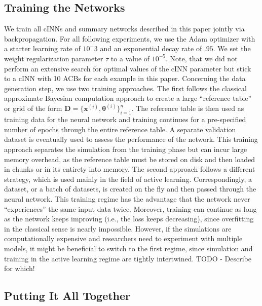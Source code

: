 \documentclass[9pt,twoside,lineno]{pnas-new}
\begin{document}
\subsection*{Training the Networks}
We train all cINNs and summary networks described in this paper jointly via backpropagation. For all following experiments, we use the Adam optimizer  with a starter learning rate of $10^-3$ and an exponential decay rate of $.95$. We set the weight regularization parameter $\tau$ to a value of $10^{-5}$. Note, that we did not perform an extensive search for optimal values of the cINN parameter but stick to a cINN with 10 ACBs for each example in this paper.
Concerning the data generation step, we use two training approaches. The first follows the classical approximate Bayesian computation approach to create a large “reference table” or grid of the form $\boldsymbol{D} = \{\boldsymbol{x}^{(i)}, \boldsymbol{\theta}^{(i)}\}_{i=1}^{n}$. The reference table is then used as training data for the neural network and training continues for a pre-specified number of epochs through the entire reference table. A separate validation dataset is eventually used to assess the performance of the network. This training approach separates the simulation from the training phase but can incur large memory overhead, as the reference table must be stored on disk and then loaded in chunks or in its entirety into memory. The second approach follows a different strategy, which is used mainly in the field of active learning. Correspondingly, a dataset, or a batch of datasets, is created on the fly and then passed through the neural network. This training regime has the advantage that the network never “experiences” the same input data twice. Moreover, training can continue as long as the network keeps improving (i.e., the loss keeps decreasing), since overfitting in the classical sense is nearly impossible. However, if the simulations are computationally expensive and researchers need to experiment with multiple models, it might be beneficial to switch to the first regime, since simulation and training in the active learning regime are tightly intertwined. TODO - Describe for which!

\subsection*{Putting It All Together}
\end{document}
